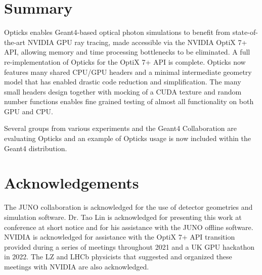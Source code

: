 \documentclass{webofc}
\begin{document}
\section{Summary}
%
Opticks enables Geant4-based optical photon simulations to benefit from 
state-of-the-art NVIDIA GPU ray tracing, made accessible via the NVIDIA OptiX 7+ API,
allowing memory and time processing bottlenecks to be eliminated. 
A full re-implementation of Opticks for the OptiX 7+ API is complete. 
Opticks now features many shared CPU/GPU headers and a minimal intermediate geometry model 
that has enabled drastic code reduction and simplification. 
The many small headers design together with mocking of a CUDA texture and 
random number functions enables fine grained testing of almost all functionality 
on both GPU and CPU.

Several groups from various experiments and the Geant4 Collaboration are evaluating Opticks
and an example of Opticks usage is now included within the Geant4 distribution. 
%
%
\newpage
\section*{Acknowledgements}
%
The JUNO collaboration is acknowledged for the use of detector 
geometries and simulation software. Dr. Tao Lin is acknowledged for presenting 
this work at conference at short notice and for his assistance with 
the JUNO offline software. NVIDIA is acknowledged for assistance 
with the OptiX 7+ API transition provided during a series of meetings 
throughout 2021 and a UK GPU hackathon in 2022. 
The LZ and LHCb physicists that suggested and organized these meetings with 
NVIDIA are also acknowledged.  
\end{document}
